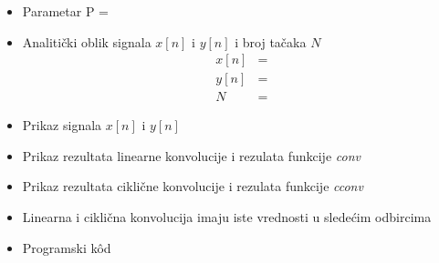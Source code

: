 
\begin{itemize}
    \item Parametar P = 
    \item Analitički oblik signala $x[n]$ i $y[n]$ i broj tačaka $N$
    \begin{align*}
        x[n] &= \\
        y[n] &= \\
        N &=
    \end{align*}
    \item Prikaz signala $x[n]$ i $y[n]$
    \item Prikaz rezultata linearne konvolucije i rezulata funkcije \textit{conv}
    \item Prikaz rezultata ciklične konvolucije i rezulata funkcije \textit{cconv}
    \item Linearna i ciklična konvolucija imaju iste vrednosti u sledećim odbircima
    \item Programski k\^{o}d 
\end{itemize}